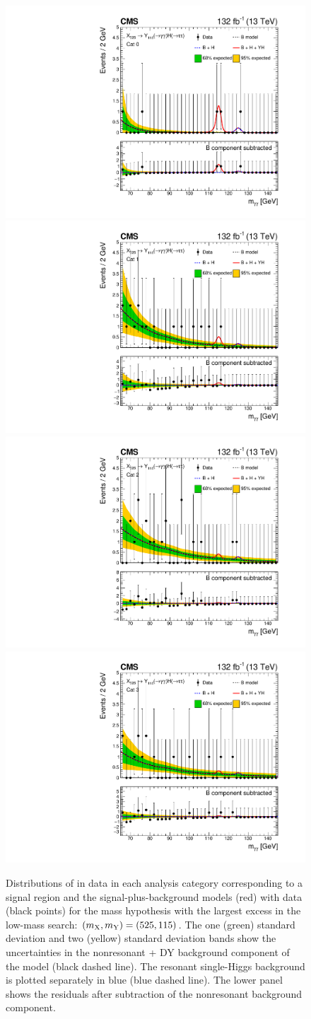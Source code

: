 \begin{figure}
    \centering
    \includegraphics[width=.45\linewidth]{Figures/Dihiggs/results/sb_models/y_gg_low_mass/ARCGL_Y_gg_Low_Mass_mx525my125mh115_ggttresmx525my125cat0_CMS_hgg_mass_nbins40_paper.pdf}
    \includegraphics[width=.45\linewidth]{Figures/Dihiggs/results/sb_models/y_gg_low_mass/ARCGL_Y_gg_Low_Mass_mx525my125mh115_ggttresmx525my125cat1_CMS_hgg_mass_nbins40_paper.pdf}
    \includegraphics[width=.45\linewidth]{Figures/Dihiggs/results/sb_models/y_gg_low_mass/ARCGL_Y_gg_Low_Mass_mx525my125mh115_ggttresmx525my125cat2_CMS_hgg_mass_nbins40_paper.pdf}
    \includegraphics[width=.45\linewidth]{Figures/Dihiggs/results/sb_models/y_gg_low_mass/ARCGL_Y_gg_Low_Mass_mx525my125mh115_ggttresmx525my125cat3_CMS_hgg_mass_nbins40_paper.pdf}
    \caption[Signal-Plus-Background Fits to Data for Low-Mass \XYggHtt Search at $(\mX,\mY)=(525,115)$\GeV]{Distributions of \mgg in data in each analysis category corresponding to a signal region and the signal-plus-background models (red) with data (black points) for the mass hypothesis with the largest excess in the low-mass \XYggHtt search: $(\mX,\mY)=(525,115)$\GeV. The one (green) standard deviation and two (yellow) standard deviation bands show the uncertainties in the nonresonant + DY background component of the model (black dashed line). The resonant single-Higgs background is plotted separately in blue (blue dashed line). The lower panel shows the residuals after subtraction of the nonresonant background component.}\label{fig:sbmodel_3}

\end{figure}

